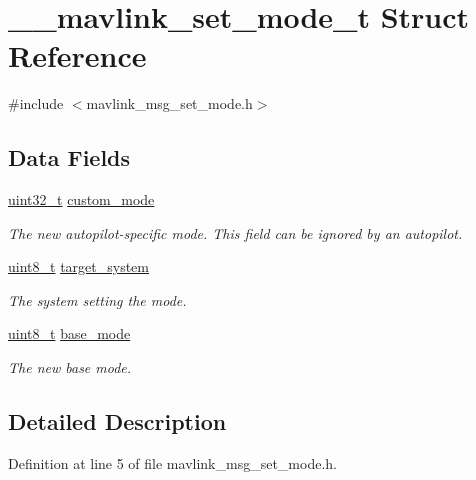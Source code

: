 \hypertarget{struct____mavlink__set__mode__t}{\section{\-\_\-\-\_\-mavlink\-\_\-set\-\_\-mode\-\_\-t Struct Reference}
\label{struct____mavlink__set__mode__t}
}


{\ttfamily \#include $<$mavlink\-\_\-msg\-\_\-set\-\_\-mode.\-h$>$}

\subsection*{Data Fields}
\begin{DoxyCompactItemize}
\item 
\hyperlink{stdint_8h_a435d1572bf3f880d55459d9805097f62}{uint32\-\_\-t} \hyperlink{struct____mavlink__set__mode__t_ab932915605e53ff1f42c57f3159b63f6}{custom\-\_\-mode}
\begin{DoxyCompactList}\small\item\em The new autopilot-\/specific mode. This field can be ignored by an autopilot. \end{DoxyCompactList}\item 
\hyperlink{stdint_8h_aba7bc1797add20fe3efdf37ced1182c5}{uint8\-\_\-t} \hyperlink{struct____mavlink__set__mode__t_a58cf8afdf2920c038cae4645c79ac372}{target\-\_\-system}
\begin{DoxyCompactList}\small\item\em The system setting the mode. \end{DoxyCompactList}\item 
\hyperlink{stdint_8h_aba7bc1797add20fe3efdf37ced1182c5}{uint8\-\_\-t} \hyperlink{struct____mavlink__set__mode__t_a7a48085507fabce566221fb4ede8c8a6}{base\-\_\-mode}
\begin{DoxyCompactList}\small\item\em The new base mode. \end{DoxyCompactList}\end{DoxyCompactItemize}


\subsection{Detailed Description}


Definition at line 5 of file mavlink\-\_\-msg\-\_\-set\-\_\-mode.\-h.



